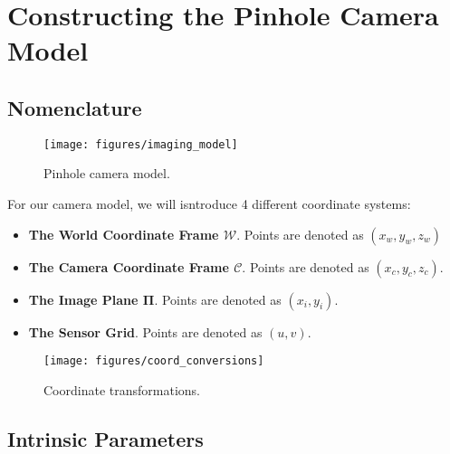 \section{Constructing the Pinhole Camera Model}

\subsection{Nomenclature}
\begin{figure}[H]
    \centering
    \texttt{[image: figures/imaging\_model]}
    \caption{Pinhole camera model.}
\end{figure}

For our camera model, we will isntroduce 4 different coordinate systems:
\begin{itemize}[leftmargin=!, itemindent=-4ex]
    \item\textbf{The World Coordinate Frame $\boldsymbol{\mathcal{W}}$}. Points are denoted as $\left(x_w, y_w, z_w\right)$
    \item\textbf{The Camera Coordinate Frame $\boldsymbol{\mathcal{C}}$}. Points are denoted as $\left(x_c, y_c, z_c\right)$.
    \item\textbf{The Image Plane $\boldsymbol{\Pi}$}. Points are denoted as $\left(x_i, y_i\right)$.
    \item\textbf{The Sensor Grid}. Points are denoted as $\left(u, v\right)$.
\end{itemize}




\begin{figure}[H]
    \centering
    \texttt{[image: figures/coord\_conversions]}
    \caption{Coordinate transformations.}
\end{figure}


\subsection{Intrinsic Parameters} \label{sec:intrinsics}

